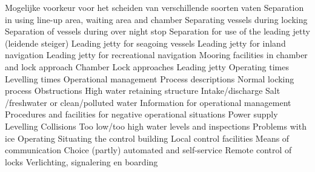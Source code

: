 \newline \indent Mogelijke voorkeur voor het scheiden van verschillende soorten vaten
Separation in using line-up area, waiting area and chamber
Separating vessels during locking
Separation of vessels during over night stop
Separation for use of the leading jetty (leidende steiger)
Leading jetty for seagoing vessels
Leading jetty for inland navigation
Leading jetty for recreational navigation
\newline \indent Mooring facilities in chamber and lock approach
Chamber
Lock approaches
Leading jetty
\newline \indent Operating times
\newline \indent Levelling times
\newline \indent Operational management
Process descriptions
Normal locking process
Obstructions
High water retaining structure
Intake/discharge
Salt /freshwater or clean/polluted water
Information for operational management
Procedures and facilities for negative operational situations
Power supply
Levelling%
Collisions
Too low/too high water levels and inspections
Problems with ice
\newline \indent Operating
Situating the control building
Local control facilities
Means of communication
Choice (partly) automated and self-service
Remote control of locks
\newline \indent Verlichting, signalering en boarding
